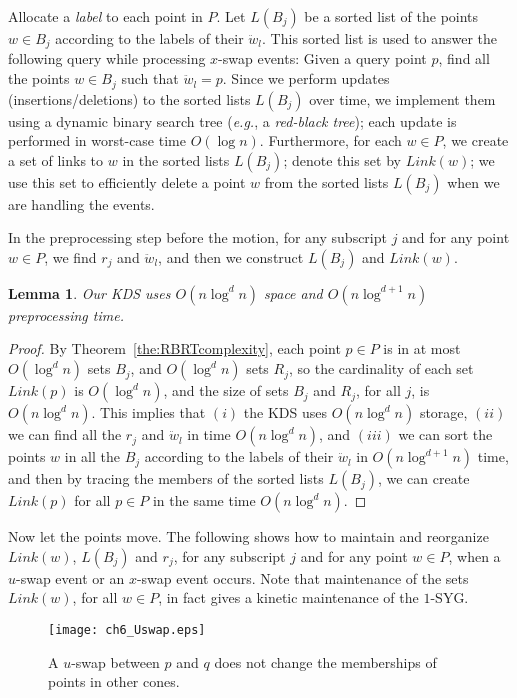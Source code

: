 \documentclass[preprint,12pt]{elsarticle}
\def\1syg{\mbox{$1$-SYG}}
\newcommand{\eg}{\emph{e.g.}}
\newtheorem{lemma}{Lemma}[section]
\begin{document}
Allocate a \textit{label} to each point in $P$. Let $L(B_j)$ be a sorted list of the points $w\in B_j$ according to the labels of their $\ddot{w}_l$. This sorted list is used to answer the following query while processing $x$-swap events: Given a query point $p$, find all the points $w\in B_j$ such that $\ddot{w}_l=p$. Since we perform  updates (insertions/deletions) to the sorted lists $L(B_j)$ over time, we implement them using a dynamic binary search tree (\eg, a \textit{red-black tree}); each update is performed in worst-case time $O(\log n)$. Furthermore, for each $w\in P$, we create a set of links to $w$ in the sorted lists $L(B_j)$; denote this set by $Link(w)$; we use this set to efficiently delete a point $w$ from the sorted lists $L(B_j)$ when we are handling the events.

In the preprocessing step before the motion, for any subscript $j$ and for any point $w\in P$, we find $r_j$ and $\ddot{w}_l$, and then we construct $L(B_j)$ and $Link(w)$.

\begin{lemma}\label{the:PreProcStep}
Our KDS uses  $O(n\log^dn)$ space and $O(n\log^{d+1}n)$ preprocessing time.
\end{lemma}
\begin{proof}
By Theorem~\ref{the:RBRTcomplexity}, each point $p\in P$ is in at most $O(\log^d n)$ sets $B_j$, and $O(\log^dn)$ sets $R_j$, so the cardinality of each set $Link(p)$ is $O(\log^d n)$, and the size of sets $B_j$ and $R_j$, for all $j$, is $O(n\log^dn)$. This implies that $(i)$ the KDS uses $O(n\log^dn)$ storage, $(ii)$ we can find all the $r_j$ and $\ddot{w}_l$ in time $O(n\log^d n)$, and $(iii)$  we can sort the points $w$ in all the $B_j$ according to the labels of their $\ddot{w}_l$ in $O(n\log^{d+1}n)$ time, and then by tracing the members of the sorted lists $L(B_j)$, we can create $Link(p)$ for all $p\in P$ in the same time  $O(n\log^{d}n)$.
\end{proof}

Now let the points move. The following shows how to maintain and reorganize $Link(w)$, $L(B_j)$ and $r_j$, for any subscript $j$ and for any point $w\in P$,  when a $u$-swap event or an $x$-swap event occurs. Note that maintenance of the sets $Link(w)$, for all $w\in P$, in fact gives a kinetic maintenance of the \1syg.

\begin{figure}[t]
\centering
\texttt{[image: ch6\_Uswap.eps]}
\caption{A $u$-swap between $p$ and $q$ does not change the memberships of points in other cones.}
\label{fig:Uswap}
\end{figure}
\end{document}
